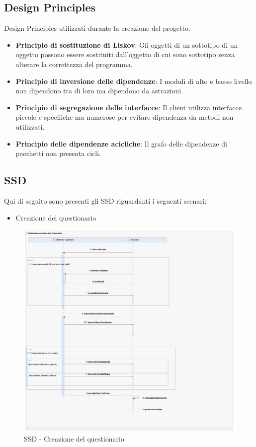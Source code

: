 \documentclass[12pt]{article}
\begin{document}
\subsection{Design Principles}
Design Principles utilizzati durante la creazione del progetto.
\begin{itemize}
	\item \textbf{Principio di sostituzione di Liskov}: Gli oggetti di un sottotipo di un oggetto possono essere sostituiti dall'oggetto di cui sono sottotipo senza alterare la correttezza del programma.
	\item \textbf{Principio di inversione delle dipendenze}: I moduli di alto e basso livello non dipendono tra di loro ma dipendono da astrazioni.
	\item \textbf{Principio di segregazione delle interfacce}: Il client utilizza interfacce piccole e specifiche ma numerose per evitare dipendenza da metodi non utilizzati.
	\item \textbf{Principio delle dipendenze acicliche}: Il grafo delle dipendenze di pacchetti non presenta cicli.
\end{itemize}

\subsection{SSD}
Qui di seguito sono presenti gli SSD riguardanti i seguenti scenari:
\begin{itemize}
\item Creazione del questionario
\end{itemize}

\begin{figure}[H]
\centering
\includegraphics[scale=0.47]{UNIMIBModule_CreazionequestionarioSequenceDiagram.png}
\caption{SSD - Creazione del questionario}
\end{figure}
\end{document}
